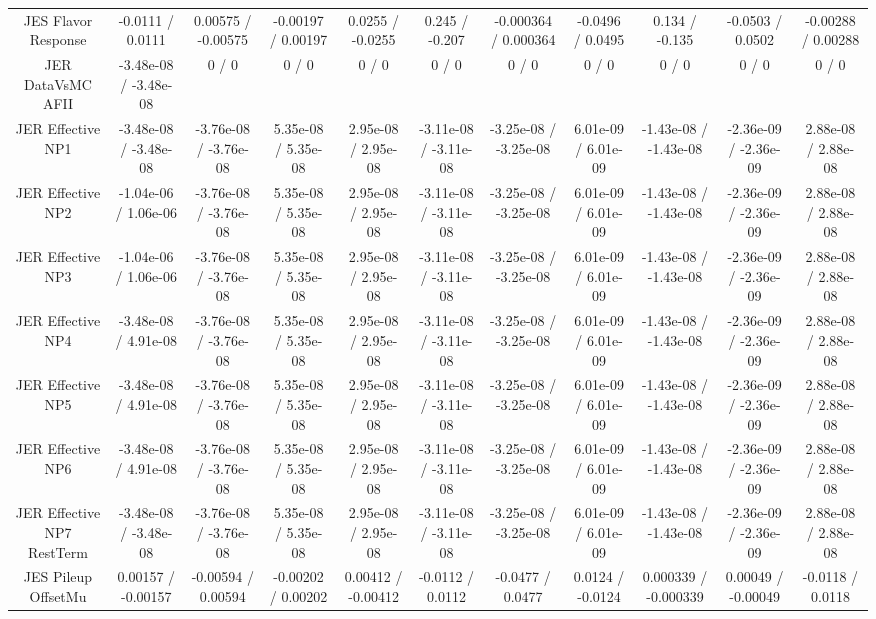 \begin{table}[htbp]
\begin{center}
\begin{tabular}{|c|c|c|c|c|c|c|c|c|c|c|}
  JES Flavor Response & -0.0111 / 0.0111 & 0.00575 / -0.00575 & -0.00197 / 0.00197 & 0.0255 / -0.0255 & 0.245 / -0.207 & -0.000364 / 0.000364 & -0.0496 / 0.0495 & 0.134 / -0.135 & -0.0503 / 0.0502 & -0.00288 / 0.00288 \\ 
  JER DataVsMC AFII & -3.48e-08 / -3.48e-08 & 0 / 0 & 0 / 0 & 0 / 0 & 0 / 0 & 0 / 0 & 0 / 0 & 0 / 0 & 0 / 0 & 0 / 0 \\ 
  JER Effective NP1 & -3.48e-08 / -3.48e-08 & -3.76e-08 / -3.76e-08 & 5.35e-08 / 5.35e-08 & 2.95e-08 / 2.95e-08 & -3.11e-08 / -3.11e-08 & -3.25e-08 / -3.25e-08 & 6.01e-09 / 6.01e-09 & -1.43e-08 / -1.43e-08 & -2.36e-09 / -2.36e-09 & 2.88e-08 / 2.88e-08 \\ 
  JER Effective NP2 & -1.04e-06 / 1.06e-06 & -3.76e-08 / -3.76e-08 & 5.35e-08 / 5.35e-08 & 2.95e-08 / 2.95e-08 & -3.11e-08 / -3.11e-08 & -3.25e-08 / -3.25e-08 & 6.01e-09 / 6.01e-09 & -1.43e-08 / -1.43e-08 & -2.36e-09 / -2.36e-09 & 2.88e-08 / 2.88e-08 \\ 
  JER Effective NP3 & -1.04e-06 / 1.06e-06 & -3.76e-08 / -3.76e-08 & 5.35e-08 / 5.35e-08 & 2.95e-08 / 2.95e-08 & -3.11e-08 / -3.11e-08 & -3.25e-08 / -3.25e-08 & 6.01e-09 / 6.01e-09 & -1.43e-08 / -1.43e-08 & -2.36e-09 / -2.36e-09 & 2.88e-08 / 2.88e-08 \\ 
  JER Effective NP4 & -3.48e-08 / 4.91e-08 & -3.76e-08 / -3.76e-08 & 5.35e-08 / 5.35e-08 & 2.95e-08 / 2.95e-08 & -3.11e-08 / -3.11e-08 & -3.25e-08 / -3.25e-08 & 6.01e-09 / 6.01e-09 & -1.43e-08 / -1.43e-08 & -2.36e-09 / -2.36e-09 & 2.88e-08 / 2.88e-08 \\ 
  JER Effective NP5 & -3.48e-08 / 4.91e-08 & -3.76e-08 / -3.76e-08 & 5.35e-08 / 5.35e-08 & 2.95e-08 / 2.95e-08 & -3.11e-08 / -3.11e-08 & -3.25e-08 / -3.25e-08 & 6.01e-09 / 6.01e-09 & -1.43e-08 / -1.43e-08 & -2.36e-09 / -2.36e-09 & 2.88e-08 / 2.88e-08 \\ 
  JER Effective NP6 & -3.48e-08 / 4.91e-08 & -3.76e-08 / -3.76e-08 & 5.35e-08 / 5.35e-08 & 2.95e-08 / 2.95e-08 & -3.11e-08 / -3.11e-08 & -3.25e-08 / -3.25e-08 & 6.01e-09 / 6.01e-09 & -1.43e-08 / -1.43e-08 & -2.36e-09 / -2.36e-09 & 2.88e-08 / 2.88e-08 \\ 
  JER Effective NP7 RestTerm & -3.48e-08 / -3.48e-08 & -3.76e-08 / -3.76e-08 & 5.35e-08 / 5.35e-08 & 2.95e-08 / 2.95e-08 & -3.11e-08 / -3.11e-08 & -3.25e-08 / -3.25e-08 & 6.01e-09 / 6.01e-09 & -1.43e-08 / -1.43e-08 & -2.36e-09 / -2.36e-09 & 2.88e-08 / 2.88e-08 \\ 
  JES Pileup OffsetMu & 0.00157 / -0.00157 & -0.00594 / 0.00594 & -0.00202 / 0.00202 & 0.00412 / -0.00412 & -0.0112 / 0.0112 & -0.0477 / 0.0477 & 0.0124 / -0.0124 & 0.000339 / -0.000339 & 0.00049 / -0.00049 & -0.0118 / 0.0118 \\ 

\end{tabular}
\end{center}
\end{table}
